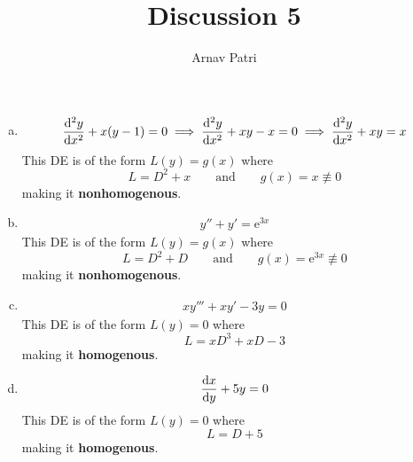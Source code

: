 \documentclass[A4, 12pt]{article}
\title{Discussion 5}
\author{Arnav Patri}
\newcommand{\en}{\text{e}}
\begin{document}
	\maketitle
	\thispagestyle{empty}
		\begin{enumerate}[a)]
			\item 
				\[
					\dv[2]{y}{x} + x(y - 1) = 0 \implies
							\dv[2]{y}{x} + xy - x = 0 \implies
							\dv[2]{y}{x} + xy = x 
				\]
				This DE is of the form \(L(y) = g(x)\) where
				\[
					L = D^2 + x \qquad \text{and} \qquad
						g(x) = x \not\equiv 0
				\]
				making it \textbf{nonhomogenous}.
			\item
				\begin{align*}
					y'' + y' = \en^{3x}
				\end{align*}
				This DE is of the form \(L(y) = g(x)\) where
				\[
					L = D^2 + D \qquad \text{and} \qquad
						g(x) = \en^{3x} \not\equiv 0
				\]
				making it \textbf{nonhomogenous}.
			\item
				\begin{align*}
					xy''' + xy' - 3y = 0
				\end{align*}
				This DE is of the form \(L(y) = 0\) where
				\[
					L = xD^3 + xD - 3
				\]
				making it \textbf{homogenous}.
			\item
				\begin{align*}
					\dv{x}{y} + 5y = 0
				\end{align*}
				This DE is of the form \(L(y) = 0\) where
				\[
					L = D + 5
				\]
				making it \textbf{homogenous}.
		\end{enumerate}
\end{document}

